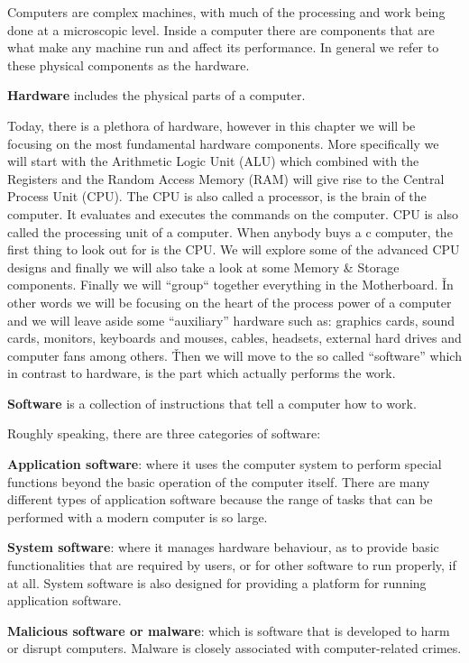 Computers are complex machines, with much of the processing and work being done at a microscopic
level. Inside a computer there are components that are what make any machine run and affect its performance. In
general we refer to these physical components as the hardware.

\bd[Hardware]
\textbf{Hardware} includes the physical parts of a computer.
\ed

Today, there is a plethora of hardware, however in this chapter we will be focusing on the most fundamental hardware
components. More specifically we will start with the Arithmetic Logic Unit (ALU) which combined with the Registers
and the Random Access Memory (RAM) will give rise to the Central Process Unit (CPU). The CPU is also called a
processor, is the brain of the computer. It evaluates and executes the commands on the computer. CPU is also called
the processing unit of a computer. When anybody buys a c computer, the first thing to look out for is the CPU. We
will explore some of the advanced CPU designs and finally we will also take a look at some Memory \& Storage
components. Finally we will ``group`` together everything in the Motherboard. \v

In other words we will be focusing on the heart of the process power of a computer and we will leave aside some
``auxiliary'' hardware such as: graphics cards, sound cards, monitors, keyboards and mouses, cables, headsets,
external hard drives and computer fans among others. \v

Then we will move to the so called ``software'' which in contrast to hardware, is the part which actually performs
the work.

\bd[Software]
\textbf{Software} is a collection of instructions that tell a computer how to work.
\ed

Roughly speaking, there are three categories of software:
\bit
\item \textbf{Application software}: where it uses the computer system to perform special functions beyond the basic
operation of the computer itself. There are many different types of application software because the range of tasks
that can be performed with a modern computer is so large.
\item \textbf{System software}: where it manages hardware behaviour, as to provide basic functionalities that are
required by users, or for other software to run properly, if at all. System software is also designed for providing a
platform for running application software.
\item \textbf{Malicious software or malware}: which is software that is developed to harm or disrupt computers.
Malware is closely associated with computer-related crimes.
\eit

